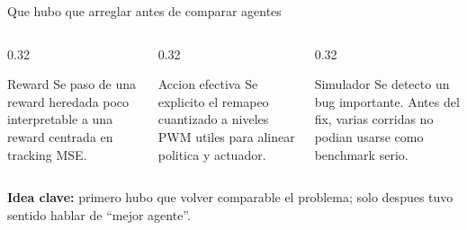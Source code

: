 \documentclass[aspectratio=169,11pt]{beamer}
\begin{document}
\begin{frame}{Que hubo que arreglar antes de comparar agentes}
\begin{columns}[T]
\begin{column}{0.32\linewidth}
\begin{block}{Reward}
Se paso de una reward heredada poco interpretable a una reward centrada en tracking MSE.
\end{block}
\end{column}
\begin{column}{0.32\linewidth}
\begin{block}{Accion efectiva}
Se explicito el remapeo cuantizado a niveles PWM utiles para alinear politica y actuador.
\end{block}
\end{column}
\begin{column}{0.32\linewidth}
\begin{alertblock}{Simulador}
Se detecto un bug importante. Antes del fix, varias corridas no podian usarse como benchmark serio.
\end{alertblock}
\end{column}
\end{columns}

\vspace{0.25cm}
\small
\textbf{Idea clave:} primero hubo que volver comparable el problema; solo despues tuvo sentido hablar de ``mejor agente''.
\end{frame}
\end{document}

